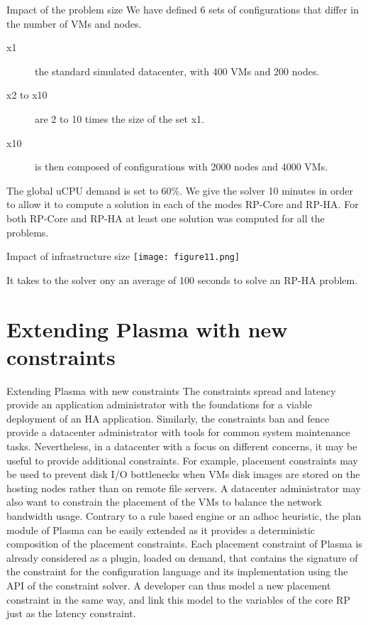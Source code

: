 \begin{frame}{Impact of the problem size}
We have defined 6 sets of
configurations that differ in the number of VMs and nodes. 
\begin{description}
\item[x1] the standard simulated datacenter, with 400 VMs and 200 nodes. 
\item[x2 to x10] are 2 to 10 times the size of the set x1.
\item[x10] is then composed of configurations with 2000 nodes and 4000 VMs. 
\end{description}

The global uCPU demand
is set to 60\%. We give the solver 10 minutes in order to allow it to compute a
solution in each of the modes RP-Core and RP-HA. For both RP-Core and RP-HA
at least one solution was computed for all the problems.

\end{frame}
\begin{frame}{Impact of infrastructure size}
\texttt{[image: figure11.png]} 

It takes to the solver
ony an average of 100 seconds to solve an RP-HA problem.
\end{frame}

\section{Extending Plasma with new constraints} 
\begin{frame}{Extending Plasma with new constraints}
The constraints spread and latency provide an application administrator with
the foundations for a viable deployment of an HA application. Similarly, the
constraints ban and fence provide a datacenter administrator with tools for
common system maintenance tasks. Nevertheless, in a datacenter with a focus
on different concerns, it may be useful to provide additional constraints. For
example, placement constraints may be used to prevent disk I/O bottlenecks
when VMs disk images are stored on the hosting nodes rather than on remote file
servers. A datacenter administrator may also want to constrain the placement
of the VMs to balance the network bandwidth usage.
\br
    Contrary to a rule based engine or an adhoc heuristic, the plan module
of Plasma can be easily extended as it provides a deterministic composition
of the placement constraints. Each placement constraint of Plasma is already
considered as a plugin, loaded on demand, that contains the signature of the
constraint for the configuration language and its implementation using the API
of the constraint solver. A developer can thus model a new placement constraint
in the same way, and link this model to the variables of the core RP just as the
latency constraint.

\end{frame}
